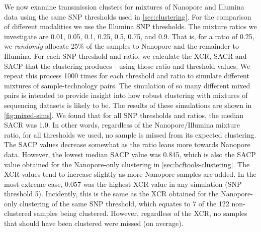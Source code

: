 We now examine transmission clusters for mixtures of Nanopore and
Illumina data using the same SNP thresholds used in \autoref{sec:clustering}. For the comparison of different
modalities we use the Illumina SNP thresholds. The mixture
ratios we investigate are 0.01, 0.05, 0.1, 0.25, 0.5, 0.75, and 0.9.
That is, for a ratio of 0.25, we \emph{randomly} allocate 25\% of the samples
to Nanopore and the remainder to Illumina. For each SNP threshold and
ratio, we calculate the XCR, SACR and SACP that the clustering produces
- using those ratio and threshold values. We repeat this process 1000
times for each threshold and ratio to simulate different mixtures of
sample-technology pairs. The simulation of so many different mixed pairs
is intended to provide insight into how robust clustering with mixtures
of sequencing datasets is likely to be. 
The results of these simulations
are shown in \autoref{fig:mixed-sims}. We found that for
all SNP thresholds and ratios, the median SACR was 1.0. In other words,
regardless of the Nanopore/Illumina mixture ratio, for all thresholds we
used, no sample is missed from its expected clustering. The SACP values
decrease somewhat as the ratio leans more towards Nanopore data.
However, the lowest median SACP value was 0.845, which is also the SACP
value obtained for the Nanopore-only clustering in
\autoref{sec:bcftools-clustering}. The XCR values tend to increase
slightly as more Nanopore samples are added. In the most extreme case,
0.057 was the highest XCR value in any simulation (SNP threshold 5).
Incidently, this is the same as the XCR obtained for the Nanopore-only
clustering of the same SNP threshold, which equates to 7 of the 122
non-clustered samples being clustered. However, regardless of the XCR,
no samples that should have been clustered were missed (on average).

